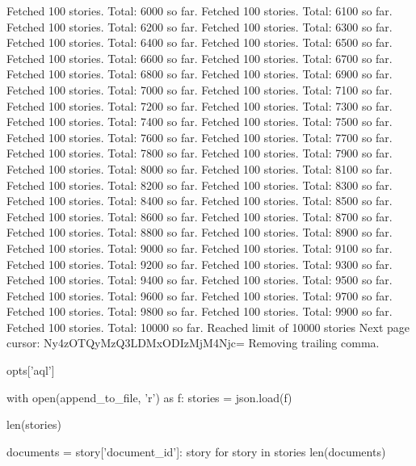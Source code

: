\begin{pyprint}
Fetched 100 stories. Total: 6000 so far.
Fetched 100 stories. Total: 6100 so far.
Fetched 100 stories. Total: 6200 so far.
Fetched 100 stories. Total: 6300 so far.
Fetched 100 stories. Total: 6400 so far.
Fetched 100 stories. Total: 6500 so far.
Fetched 100 stories. Total: 6600 so far.
Fetched 100 stories. Total: 6700 so far.
Fetched 100 stories. Total: 6800 so far.
Fetched 100 stories. Total: 6900 so far.
Fetched 100 stories. Total: 7000 so far.
Fetched 100 stories. Total: 7100 so far.
Fetched 100 stories. Total: 7200 so far.
Fetched 100 stories. Total: 7300 so far.
Fetched 100 stories. Total: 7400 so far.
Fetched 100 stories. Total: 7500 so far.
Fetched 100 stories. Total: 7600 so far.
Fetched 100 stories. Total: 7700 so far.
Fetched 100 stories. Total: 7800 so far.
Fetched 100 stories. Total: 7900 so far.
Fetched 100 stories. Total: 8000 so far.
Fetched 100 stories. Total: 8100 so far.
Fetched 100 stories. Total: 8200 so far.
Fetched 100 stories. Total: 8300 so far.
Fetched 100 stories. Total: 8400 so far.
Fetched 100 stories. Total: 8500 so far.
Fetched 100 stories. Total: 8600 so far.
Fetched 100 stories. Total: 8700 so far.
Fetched 100 stories. Total: 8800 so far.
Fetched 100 stories. Total: 8900 so far.
Fetched 100 stories. Total: 9000 so far.
Fetched 100 stories. Total: 9100 so far.
Fetched 100 stories. Total: 9200 so far.
Fetched 100 stories. Total: 9300 so far.
Fetched 100 stories. Total: 9400 so far.
Fetched 100 stories. Total: 9500 so far.
Fetched 100 stories. Total: 9600 so far.
Fetched 100 stories. Total: 9700 so far.
Fetched 100 stories. Total: 9800 so far.
Fetched 100 stories. Total: 9900 so far.
Fetched 100 stories. Total: 10000 so far.
Reached limit of 10000 stories
Next page cursor: Ny4zOTQyMzQ3LDMxODIzMjM4Njc=
Removing trailing comma.
\end{pyprint}

\begin{pyin}
opts['aql']
\end{pyin}

\begin{pyin}
with open(append_to_file, 'r') as f:
    stories = json.load(f)
\end{pyin}

\begin{pyin}
len(stories)
\end{pyin}

\begin{pyin}
documents = {story['document_id']: story for story in stories}
len(documents)
\end{pyin}

\begin{pyin}

\end{pyin}
